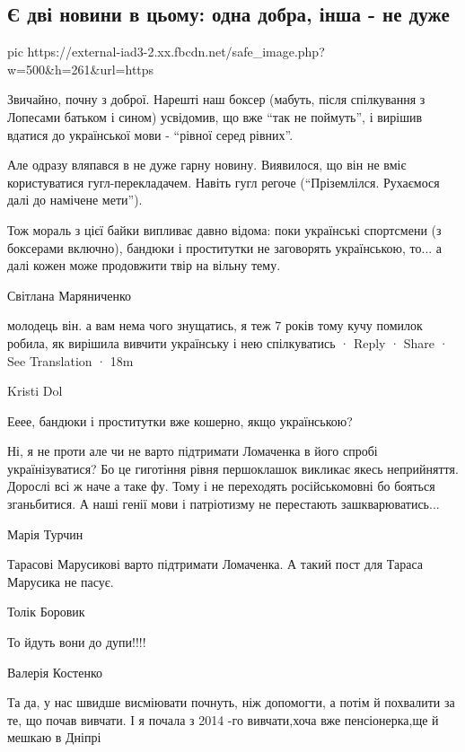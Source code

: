  
 
 
 
 

\subsection{Є дві новини в цьому: одна добра, інша - не дуже}
\label{sec:13_05_2021.fb.promovugroup.1.mova_usik}


\ifcmt
  pic https://external-iad3-2.xx.fbcdn.net/safe_image.php?w=500&h=261&url=https%
\fi


Звичайно, почну з доброї. Нарешті наш боксер (мабуть, після спілкування з
Лопесами батьком і сином) усвідомив, що вже \enquote{так не поймуть}, і вирішив
вдатися до української мови - \enquote{рівної серед рівних}.

Але одразу вляпався в не дуже гарну новину. Виявилося, що він не вміє
користуватися гугл-перекладачем. Навіть гугл регоче (\enquote{Пріземлілся. Рухаємося далі до намічене мети}).

Тож мораль з цієї байки випливає давно відома: поки українські спортсмени (з
боксерами включно), бандюки і проститутки не заговорять українською, то... а
далі кожен може продовжити твір на вільну тему.

Світлана Маряниченко

молодець він. а вам нема чого знущатись, я теж 7 років тому кучу помилок
робила, як вирішила вивчити українську і нею спілкуватись · Reply · Share · See
Translation · 18m

Kristi Dol

Ееее, бандюки і проститутки вже кошерно, якщо українською?

Ні, я не проти але чи не варто підтримати Ломаченка в його спробі
українізуватися? Бо це гиготіння рівня першоклашок викликає якесь неприйняття.
Дорослі всі ж наче а таке фу. Тому і не переходять російськомовні бо бояться
зганьбитися. А наші генії мови і патріотизму не перестають зашкварюватись...

Марія Турчин

Тарасові Марусикові варто підтримати Ломаченка. А такий пост для Тараса
Марусика не пасує.  

Толік Боровик

То йдуть вони до дупи!!!!

Валерія Костенко

Та да, у нас швидше висміювати почнуть, ніж допомогти, а потім й похвалити за
те, що почав вивчати. І я почала з 2014 -го вивчати,хоча вже пенсіонерка,ще й
мешкаю в Дніпрі
